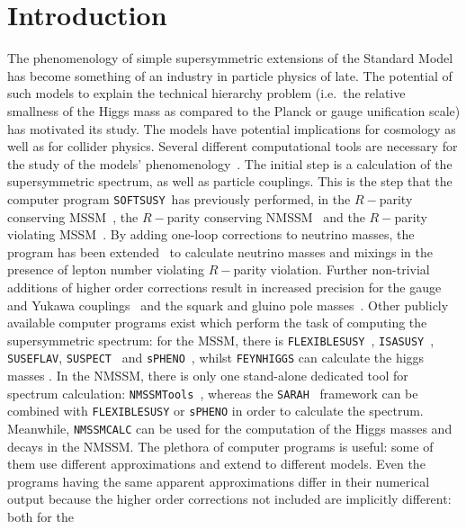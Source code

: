 \documentclass[final,3p,times]{elsarticle}
\def\SOFTSUSY{{\tt SOFTSUSY}}
\def\code#1{{\tt #1}}
\begin{document}
\section{Introduction}
The phenomenology of simple supersymmetric extensions of the Standard Model
has become something of an industry in particle physics of late. The potential
of such models to explain the technical hierarchy problem (i.e.\ the relative
smallness of the Higgs mass as compared to the Planck or gauge unification
scale) has motivated its study. The models have potential implications for
cosmology as well as for collider physics. Several different computational
tools are necessary for the study of the models'
phenomenology~\cite{Allanach:2008zn}. The initial step is a calculation of the
supersymmetric spectrum, as well as particle couplings. This is the step 
that the computer program \SOFTSUSY~has previously performed, in the
$R-$parity conserving MSSM~\cite{Allanach:2001kg}, the $R-$parity conserving
NMSSM~\cite{Allanach:2013kza} and the $R-$parity violating
MSSM~\cite{Allanach:2009bv}. By adding one-loop corrections to neutrino
masses, the program 
has been extended~\cite{Allanach:2011de} to calculate neutrino masses and
mixings in the presence of lepton number violating $R-$parity
violation. Further non-trivial 
additions of higher order corrections result in increased precision for the
gauge 
and Yukawa couplings~\cite{Allanach:2014nba} and the squark and gluino pole
masses~\cite{Allanach:2016rxd}. Other publicly available computer programs
exist which perform the task of computing the supersymmetric spectrum: for the
MSSM, there is \code{FLEXIBLESUSY}~\cite{Athron:2014yba}, 
\code{ISASUSY}~\cite{Paige:2003mg}, \code{SUSEFLAV},
\code{SUSPECT}~\cite{Djouadi:2002ze}
and \code{sPHENO}~\cite{Porod:2003um}, whilst \code{FEYNHIGGS} can calculate the
higgs masses \cite{Heinemeyer:1998yj}. In the NMSSM, there is only one
stand-alone dedicated tool for spectrum calculation:
\code{NMSSMTools}~\cite{Ellwanger:2004xm,Ellwanger:2006rn}, whereas the
\code{SARAH}~\cite{Staub:2013tta} framework can be combined with
\code{FLEXIBLESUSY} or \code{sPHENO} in order to calculate the spectrum. Meanwhile,
\code{NMSSMCALC} \cite{Baglio:2013iia} can be used for the computation of the Higgs masses
and decays in the NMSSM\@.
The plethora of computer programs is useful: some of them use different
approximations and extend to different models. Even the programs having the
same apparent approximations differ in their numerical output because the
higher order corrections not included are implicitly different: both for the
\end{document}
